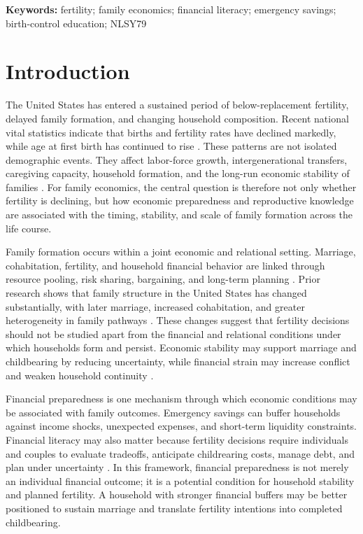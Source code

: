 \documentclass[12pt]{article}
\begin{document}
\noindent \textbf{Keywords:} fertility; family economics; financial literacy; emergency savings; birth-control education; NLSY79


\section{Introduction}

The United States has entered a sustained period of below-replacement fertility, delayed family formation, and changing household composition. Recent national vital statistics indicate that births and fertility rates have declined markedly, while age at first birth has continued to rise \citep{martin2025}. These patterns are not isolated demographic events. They affect labor-force growth, intergenerational transfers, caregiving capacity, household formation, and the long-run economic stability of families \citep{pew2025,doepke2022}. For family economics, the central question is therefore not only whether fertility is declining, but how economic preparedness and reproductive knowledge are associated with the timing, stability, and scale of family formation across the life course.

Family formation occurs within a joint economic and relational setting. Marriage, cohabitation, fertility, and household financial behavior are linked through resource pooling, risk sharing, bargaining, and long-term planning \citep{becker1981}. Prior research shows that family structure in the United States has changed substantially, with later marriage, increased cohabitation, and greater heterogeneity in family pathways \citep{smock2020}. These changes suggest that fertility decisions should not be studied apart from the financial and relational conditions under which households form and persist. Economic stability may support marriage and childbearing by reducing uncertainty, while financial strain may increase conflict and weaken household continuity \citep{charles2004,dew2012,keldenich2022}.

Financial preparedness is one mechanism through which economic conditions may be associated with family outcomes. Emergency savings can buffer households against income shocks, unexpected expenses, and short-term liquidity constraints. Financial literacy may also matter because fertility decisions require individuals and couples to evaluate tradeoffs, anticipate childrearing costs, manage debt, and plan under uncertainty \citep{lusardi2011}. In this framework, financial preparedness is not merely an individual financial outcome; it is a potential condition for household stability and planned fertility. A household with stronger financial buffers may be better positioned to sustain marriage and translate fertility intentions into completed childbearing.
\end{document}
